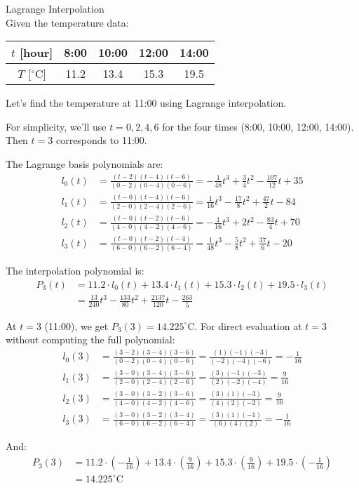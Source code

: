 \begin{example2}{Lagrange Interpolation}\\
Given the temperature data:
\begin{center}
\begin{tabular}{c|cccc}
$t$ [hour] & 8:00 & 10:00 & 12:00 & 14:00 \\
\hline
$T$ [$^{\circ}$C] & 11.2 & 13.4 & 15.3 & 19.5 \\
\end{tabular}
\end{center}

Let's find the temperature at 11:00 using Lagrange interpolation.

For simplicity, we'll use $t=0, 2, 4, 6$ for the four times (8:00, 10:00, 12:00, 14:00). Then $t=3$ corresponds to 11:00.

The Lagrange basis polynomials are:
\begin{align*}
l_0(t) &= \frac{(t-2)(t-4)(t-6)}{(0-2)(0-4)(0-6)} = -\frac{1}{48}t^3 + \frac{3}{4}t^2 - \frac{107}{12}t + 35 \\
l_1(t) &= \frac{(t-0)(t-4)(t-6)}{(2-0)(2-4)(2-6)} = \frac{1}{16}t^3 - \frac{17}{8}t^2 + \frac{47}{2}t - 84 \\
l_2(t) &= \frac{(t-0)(t-2)(t-6)}{(4-0)(4-2)(4-6)} = -\frac{1}{16}t^3 + 2t^2 - \frac{83}{4}t + 70 \\
l_3(t) &= \frac{(t-0)(t-2)(t-4)}{(6-0)(6-2)(6-4)} = \frac{1}{48}t^3 - \frac{5}{8}t^2 + \frac{37}{6}t - 20
\end{align*}

The interpolation polynomial is:
\begin{align*}
P_3(t) &= 11.2 \cdot l_0(t) + 13.4 \cdot l_1(t) + 15.3 \cdot l_2(t) + 19.5 \cdot l_3(t) \\
&= \frac{13}{240}t^3 - \frac{133}{80}t^2 + \frac{2137}{120}t - \frac{263}{5}
\end{align*}

At $t=3$ (11:00), we get $P_3(3) = 14.225^{\circ}$C.
\tcblower
For direct evaluation at $t=3$ without computing the full polynomial:
\begin{align*}
l_0(3) &= \frac{(3-2)(3-4)(3-6)}{(0-2)(0-4)(0-6)} = \frac{(1)(-1)(-3)}{(-2)(-4)(-6)} = -\frac{1}{16} \\
l_1(3) &= \frac{(3-0)(3-4)(3-6)}{(2-0)(2-4)(2-6)} = \frac{(3)(-1)(-3)}{(2)(-2)(-4)} = \frac{9}{16} \\
l_2(3) &= \frac{(3-0)(3-2)(3-6)}{(4-0)(4-2)(4-6)} = \frac{(3)(1)(-3)}{(4)(2)(-2)} = \frac{9}{16} \\
l_3(3) &= \frac{(3-0)(3-2)(3-4)}{(6-0)(6-2)(6-4)} = \frac{(3)(1)(-1)}{(6)(4)(2)} = -\frac{1}{16}
\end{align*}

And:
\begin{align*}
P_3(3) &= 11.2 \cdot (-\frac{1}{16}) + 13.4 \cdot (\frac{9}{16}) + 15.3 \cdot (\frac{9}{16}) + 19.5 \cdot (-\frac{1}{16}) \\
&= 14.225^{\circ}\text{C}
\end{align*}
\end{example2}

